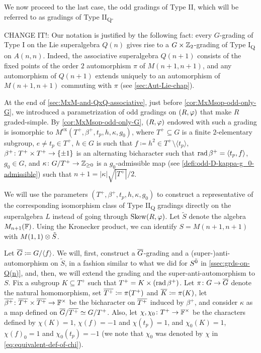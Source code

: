 We now proceed to the last case, the odd gradings of Type II, which will be referred to as gradings of Type II\textsubscript{Q}. 

\begin{remark}\label{prop:Q-implies-GxZZ2-grading-on-M-II}
    CHANGE IT!: 
    Our notation is justified by the following fact: 
    every $G$-grading of Type I on the Lie superalgebra $Q(n)$ gives rise to a $G\times \mathbb{Z}_2$-grading of Type I\textsubscript{Q} on $A(n,n)$. 
    Indeed, the associative superalgebra $Q(n+1)$ consists of the fixed points of the order $2$ automorphism $\pi$ of $M(n+1, n+1)$, and any automorphism of $Q(n+1)$ extends uniquely to an automorphism of $M(n+1, n+1)$ commuting with $\pi$ (see \cref{sec:Aut-Lie-chap}). 
\end{remark}

At the end of \cref{sec:MxM-and-QxQ-associative}, just before \cref{cor:MxMsop-odd-only-G}, we introduced a parametrization of odd gradings on $(R, \varphi)$ that make $R$ graded-simple. 
By \cref{cor:MxMsop-odd-only-G}, $(R, \varphi)$ endowed with such a grading is isomorphic to $M^{\mathrm{ex}}(T^+, \beta^+, t_p, h, \kappa, g_0)$, where $T^+ \subseteq G$ is a finite $2$-elementary subgroup, $e\neq t_p \in T^+$, $h \in G$ is such that $f \coloneqq h^2 \in T^+ \setminus \langle t_p \rangle$, $\beta^+\colon T^+ \times T^+ \to \{ \pm 1 \}$ is an alternating bicharacter such that $\operatorname{rad} \beta^+ = \langle t_p, f \rangle$, $g_0\in G$, and $\kappa\colon G/T^+ \to \mathbb{Z}_{\geq 0}$ is a $g_0$-admissible map (see \cref{defi:odd-D-kappa-g_0-admissible}) such that $n+1 = |\kappa| \sqrt{|T^+|}/2$. 

We will use the parameters $(T^+, \beta^+, t_p, h, \kappa, g_0)$ to construct a representative of the corresponding isomorphism class of Type II\textsubscript{Q} gradings directly on the superalgebra $L$ instead of going through $\operatorname{Skew}(R, \varphi)$. 
Let $\tilde S$ denote the algebra $M_{n+1}(\mathbb{F})$. 
Using the Kronecker product, we can identify $S = M(n+1, n+1)$ with $M(1, 1) \otimes \tilde S$.

Let $\barr G \coloneqq G/\langle f \rangle$. 
We will, first, construct a $\barr G$-grading and a (super-)anti-automorphism on $\tilde S$, in a fashion similar to what we did for $S^{\bar0}$ in \cref{ssec:grds-on-Q(n)}, and, then, we will extend the grading and the super-anti-automorphism to $S$. 
Fix a subgroup $K \subseteq T^+$ such that $T^+ = K \times (\operatorname{rad} \beta^+)$. 
Let $\pi\from G \to \barr G$ denote the natural homomorphism, set $\barr {T^+} \coloneqq \pi(T^+)$ and $\barr {K} \coloneqq \pi(K)$, let $\barr {\beta^+}\from \barr {T^+} \times \barr {T^+} \to \FF^\times$ be the bicharacter on $\barr {T^+}$ induced by $\beta^+$, and consider $\kappa$ as a map defined on $\barr G/\barr {T^+} \iso G/{T^+}$. 
Also, let $\chi,\chi_0 \colon T^+ \to \mathbb{F}^\times$ be the characters defined by $\chi(K) = 1$, $\chi(f) = -1$ and $\chi(t_p) = 1$, and $\chi_0(K) = 1$, $\chi(f)_0 = 1$ and $\chi_0(t_p) = -1$ (we note that $\chi_0$ was denoted by $\chi$ in \cref{eq:equivalent-def-of-chi}). 

